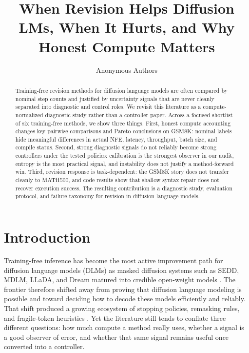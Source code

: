 \documentclass{article}
\title{When Revision Helps Diffusion LMs, When It Hurts, and Why Honest Compute Matters}
\author{Anonymous Authors}
\begin{document}
\maketitle

\begin{abstract}
Training-free revision methods for diffusion language models are often compared by nominal step counts and justified by uncertainty signals that are never cleanly separated into diagnostic and control roles. We revisit this literature as a compute-normalized diagnostic study rather than a controller paper. Across a focused shortlist of six training-free methods, we show three things. First, honest compute accounting changes key pairwise comparisons and Pareto conclusions on GSM8K: nominal labels hide meaningful differences in actual NFE, latency, throughput, batch size, and compile status. Second, strong diagnostic signals do not reliably become strong controllers under the tested policies: calibration is the strongest observer in our audit, entropy is the most practical signal, and instability does not justify a method-forward win. Third, revision response is task-dependent: the GSM8K story does not transfer cleanly to MATH500, and code results show that shallow syntax repair does not recover execution success. The resulting contribution is a diagnostic study, evaluation protocol, and failure taxonomy for revision in diffusion language models.
\end{abstract}

\section{Introduction}

Training-free inference has become the most active improvement path for diffusion language models (DLMs) as masked diffusion systems such as SEDD, MDLM, LLaDA, and Dream matured into credible open-weight models \citep{lou2024sedd,sahoo2024mdlm,nie2025llada,liu2025dream}. The frontier therefore shifted away from proving that diffusion language modeling is possible and toward deciding how to decode these models efficiently and reliably. That shift produced a growing ecosystem of stopping policies, remasking rules, and fragile-token heuristics \citep{wang2025prophet,li2025saber,zhang2026core}. Yet the literature still tends to conflate three different questions: how much compute a method really uses, whether a signal is a good observer of error, and whether that same signal remains useful once converted into a controller.
\end{document}
